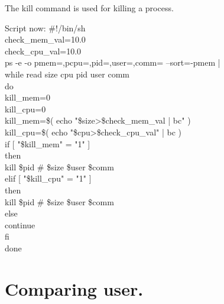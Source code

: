 \documentclass[12pt,a4paper]{article}
\begin{document}
The kill command is used for killing a process.
\newpage
\begin{flushleft}
Script now:
\newline
\#!/bin/sh\\
check\_mem\_val=10.0\\
check\_cpu\_val=10.0\\
ps -e -o pmem=,pcpu=,pid=,user=,comm= --sort=-pmem |\\
  while read size cpu pid user comm\\
  do\\
kill\_mem=0\\
kill\_cpu=0\\
kill\_mem=\$( echo "\$size>\$check\_mem\_val | bc" )\\
kill\_cpu=\$( echo "\$cpu>\$check\_cpu\_val" | bc )\\
 if [ "\$kill\_mem" = "1" ]\\
      then\\
        kill \$pid \# \$size \$user \$comm\\
      elif [ "\$kill\_cpu" = "1" ]\\
      then\\
        kill \$pid \# \$size \$user \$comm\\
      else\\
        continue\\
      fi\\
  done\\
\end{flushleft}
\newpage
\section{Comparing user.}
\end{document}
